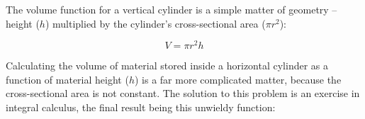 The volume function for a vertical cylinder is a simple matter of geometry -- height ($h$) multiplied by the cylinder's cross-sectional area ($\pi r^2$):

$$V = \pi r^2 h$$

Calculating the volume of material stored inside a horizontal cylinder as a function of material height ($h$) is a far more complicated matter, because the cross-sectional area is not constant.  The solution to this problem is an exercise in integral calculus, the final result being this unwieldy function:














